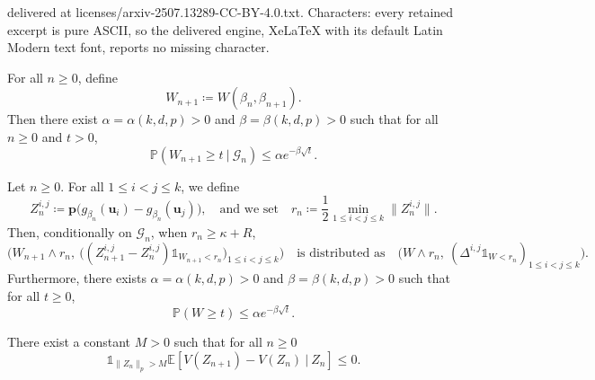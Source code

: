 \documentclass[10pt,a4paper]{amsart}
\newcommand{\E}{\mathbb{E}}
\renewcommand{\P}{\mathbb{P}}
\begin{document}
delivered at licenses/arxiv-2507.13289-CC-BY-4.0.txt. Characters: every retained excerpt is pure ASCII, so the delivered engine, XeLaTeX with its default Latin Modern text font, reports no missing character.
\begin{Proposition}
    \label{prop_block_size}
    For all $n\geq 0$, define 
        \[W_{n+1}\coloneqq W(\beta_n,\beta_{n+1}).\]
    Then there exist $\alpha=\alpha(k, d, p)>0$ and $\beta=\beta(k, d, p)>0$ such that for all $n\geq0$ and $t>0$,
        \[\P(W_{n+1}\geq t~|~\mathcal G_n)\leq\alpha e^{-\beta \sqrt t}.\]
\end{Proposition}

\begin{Theorem}
    \label{thm_renewal_decomposition}
    Let $n\geq 0$. For all $1\leq i<j\leq k$, we define
        \[Z_n^{i, j}\coloneqq \mathbf p\big(g_{\beta_n}(\mathbf u_i)-g_{\beta_n}(\mathbf u_j)\big),\quad\text{and we set}\quad r_n\coloneqq\frac{1}{2}\min_{1\leq i<j\leq k}\|Z_n^{i,j}\|.\]
    Then, conditionally on $\mathcal G_n$, when $r_n\geq \kappa+R$,
        \[\big(W_{n+1}\wedge r_n,~\big((Z^{i,j}_{n+1}-Z^{i,j}_n)\mathds 1_{W_{n+1}<r_n}\big)_{1\leq i<j\leq k}\big)\quad\text{is distributed as}\quad\big(W\wedge r_n,~(\Delta^{i,j}\mathds 1_{W<r_n})_{1\leq i<j\leq k}\big).\]
    Furthermore, there exists $\alpha=\alpha(k, d, p)>0$ and $\beta=\beta(k, d, p)>0$ such that for all $t\geq0$,
        \[\P(W\geq t)\leq\alpha e^{-\beta \sqrt t}.\]
\end{Theorem}

\begin{Proposition}
    \label{prop_lyapounov}
    There exist a constant $M>0$ such that for all $n\geq0$ 
        \[\mathds 1_{\|Z_n\|_p>M}\E[V(Z_{n+1})-V(Z_n)~\vert~Z_n]\leq0.\]
\end{Proposition}
\end{document}
